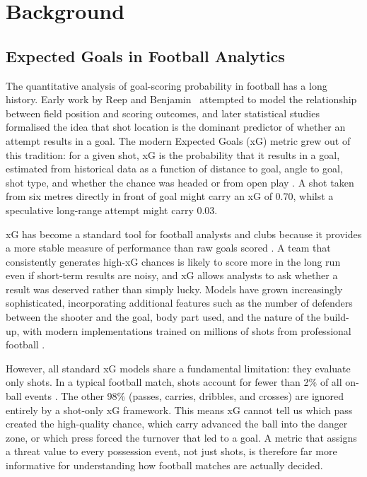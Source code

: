 \chapter{Background}\label{ch:background}

\section{Expected Goals in Football Analytics}

The quantitative analysis of goal-scoring probability in football has a long history. Early work by Reep and Benjamin~\cite{reep1968} attempted to model the relationship between field position and scoring outcomes, and later statistical studies formalised the idea that shot location is the dominant predictor of whether an attempt results in a goal. The modern Expected Goals (xG) metric grew out of this tradition: for a given shot, xG is the probability that it results in a goal, estimated from historical data as a function of distance to goal, angle to goal, shot type, and whether the chance was headed or from open play \cite{rathke2017}. A shot taken from six metres directly in front of goal might carry an xG of 0.70, whilst a speculative long-range attempt might carry 0.03.

xG has become a standard tool for football analysts and clubs because it provides a more stable measure of performance than raw goals scored \cite{statsbomb2018}. A team that consistently generates high-xG chances is likely to score more in the long run even if short-term results are noisy, and xG allows analysts to ask whether a result was deserved rather than simply lucky. Models have grown increasingly sophisticated, incorporating additional features such as the number of defenders between the shooter and the goal, body part used, and the nature of the build-up, with modern implementations trained on millions of shots from professional football \cite{lucey2015}.

However, all standard xG models share a fundamental limitation: they evaluate only shots. In a typical football match, shots account for fewer than 2\% of all on-ball events \cite{pappalardo2019}. The other 98\% (passes, carries, dribbles, and crosses) are ignored entirely by a shot-only xG framework. This means xG cannot tell us which pass created the high-quality chance, which carry advanced the ball into the danger zone, or which press forced the turnover that led to a goal. A metric that assigns a threat value to every possession event, not just shots, is therefore far more informative for understanding how football matches are actually decided.

